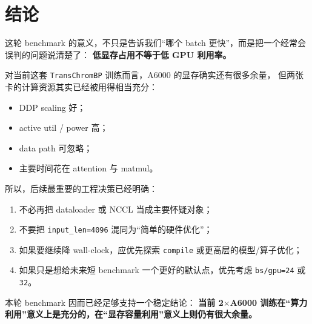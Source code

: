 \documentclass[11pt,a4paper]{ctexart}
\begin{document}
\section{结论}

这轮 benchmark 的意义，不只是告诉我们“哪个 batch 更快”，而是把一个经常会误判的问题说清楚了：
\textbf{低显存占用不等于低 GPU 利用率。}

对当前这套 \texttt{TransChromBP} 训练而言，A6000 的显存确实还有很多余量，
但两张卡的计算资源其实已经被用得相当充分：
\begin{itemize}[leftmargin=2em]
  \item DDP scaling 好；
  \item active util / power 高；
  \item data path 可忽略；
  \item 主要时间花在 attention 与 matmul。
\end{itemize}

所以，后续最重要的工程决策已经明确：
\begin{enumerate}[leftmargin=2em]
  \item 不必再把 dataloader 或 NCCL 当成主要怀疑对象；
  \item 不要把 \texttt{input\_len=4096} 混同为“简单的硬件优化”；
  \item 如果要继续降 wall-clock，应优先探索 \texttt{compile} 或更高层的模型/算子优化；
  \item 如果只是想给未来短 benchmark 一个更好的默认点，优先考虑 \texttt{bs/gpu=24} 或 \texttt{32}。
\end{enumerate}

本轮 benchmark 因而已经足够支持一个稳定结论：
\textbf{当前 2$\times$A6000 训练在“算力利用”意义上是充分的，在“显存容量利用”意义上则仍有很大余量。}
\end{document}

